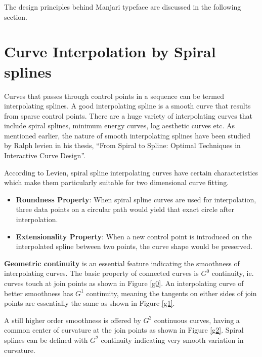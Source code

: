 \documentclass[11pt,twoside,a4paper,parskip=half]{scrartcl}
\begin{document}
 
The design principles behind Manjari typeface are discussed in the following section.
\clearpage

\section{Curve Interpolation by Spiral splines}

Curves that passes through control points in a sequence can be termed interpolating splines. A good interpolating spline is a smooth curve that results from sparse control points. There are a huge variety of interpolating curves that include spiral splines, minimum energy curves, log aesthetic curves etc. As mentioned earlier, the nature of smooth interpolating splines have been studied by Ralph levien in his thesis, ``From Spiral to Spline: Optimal Techniques in Interactive Curve Design”\citep{levien}.

According to Levien, spiral spline interpolating curves have certain characteristics which make them particularly suitable for two dimensional curve fitting.
\begin{itemize}
	
	\item \textbf{Roundness Property}: When spiral spline curves are used for interpolation, three data points on a circular path would yield that exact circle after interpolation.
	\item \textbf{Extensionality Property}: When a new control point is introduced on the interpolated spline between two points, the curve shape would be preserved.
\end{itemize}

\textbf{Geometric continuity} is an essential feature indicating the smoothness of interpolating curves. The basic property of connected curves is $G^0$ continuity, ie. curves touch at join points as shown in Figure \ref{g0}. An interpolating curve of better smoothness has $G^1$ continuity, meaning the tangents on either sides of join points are essentially the same as shown in Figure \ref{g1}. 

A still higher order smoothness is offered by $G^2$ continuous curves, having a common center of curvature at the join points as shown in Figure \ref{g2}. Spiral splines can be defined with $G^2$ continuity indicating very smooth variation in curvature. 
\end{document}
